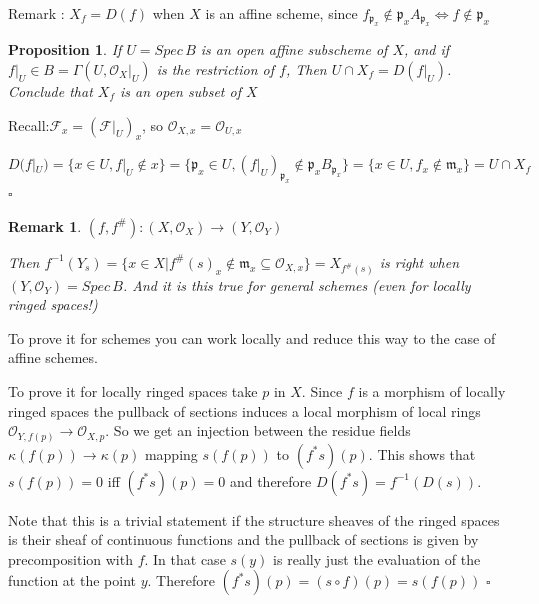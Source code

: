\documentclass{article}
\newtheorem{proposition}[theorem]{Proposition}
\newtheorem{remark}[theorem]{Remark}
\newenvironment{Proof}{{\noindent \indent \it Proof:\quad}}{\hfill $\square$\par}
\begin{document}
Remark : $X_f=D(f)$ when $X$ is an affine scheme, since $f_{\mathfrak p_x} \notin \mathfrak p_xA_{\mathfrak p_x}
\Leftrightarrow 
f\notin \mathfrak p_x$ 

\begin{proposition}
    If $U = Spec\, B$ is an open affine subscheme of $X$, and if $f|_U \in B = \Gamma (U,\mathcal O_X|_U)$ is 
the restriction of $f$, Then $U \cap X_f = D(f|_U)$. Conclude that $X_f$ is an open 
subset of $X$
\end{proposition}
\begin{Proof}
Recall:$\mathcal F_x=(\mathcal F|_U)_x$, so $\mathcal O_{X,x}=\mathcal O_{U,x}$

    $D(f|_U)=
    \{
    x\in U,f|_U\notin x
    \}
    =
    \{
    \mathfrak p_x\in U,(f|_U)_{\mathfrak p_x} \notin \mathfrak p_x B_{\mathfrak p_x}
    \}
    =
    \{
    x\in U,f_{x} \notin \mathfrak m_x
    \}
    =
    U \cap X_f
    $
\end{Proof}

\begin{remark}
$(f,f^{\#}):(X,\mathcal O_X)\to(Y,\mathcal O_Y)$

Then
$f^{-1}(Y_s) = \{x \in X | f^{\#}(s)_x \notin\mathfrak m_x \subseteq \mathcal O_{X,x} \} = X_{f^{\#}(s)}$ is right when $(Y,\mathcal O_Y)=Spec\,B$. And it is this true for general schemes (even for locally ringed spaces!)
\label{remark 3.22}
\end{remark}
\begin{Proof}
To prove it for schemes you can work locally and reduce this way to the case of affine schemes.

To prove it for locally ringed spaces take $p$ in $X$. Since $f$ is a morphism of locally ringed spaces the pullback of sections induces a local morphism of local rings $\mathcal O_{Y,f(p)} \to \mathcal O_{X,p}$. So we get an injection between the residue fields $\kappa(f(p)) \to \kappa(p)$ mapping $s(f(p))$ to $(f^\ast s)(p)$. This shows that $s(f(p)) = 0$ iff $(f^\ast s)(p) = 0$ and therefore $D(f^\ast s) = f^{-1}(D(s))$.

Note that this is a trivial statement if the structure sheaves of the ringed spaces is their sheaf of continuous functions and the pullback of sections is given by precomposition with $f$. In that case $s(y)$ is really just the evaluation of the function at the point $y$. Therefore $(f^\ast s)(p) = (s\circ f)(p) = s(f(p))$
\end{Proof}
\end{document}
